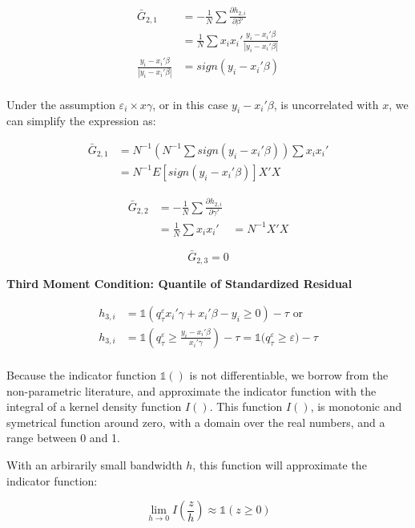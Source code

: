 \documentclass[
  authoryear,
  review,
  1p]{elsarticle}
\begin{document}
\[\begin{aligned}
\bar G_{2,1} &= -\frac{1}{N} \sum \frac{\partial h_{2,i}}{\partial \beta'} \\
             &=  \frac{1}{N} \sum x_i x_i' \frac{y_i-x_i'\beta}{|y_i-x_i'\beta|} \\
\frac{y_i-x_i'\beta}{|y_i-x_i'\beta|} &= sign(y_i-x_i'\beta) \\            
\end{aligned}
\]

Under the assumption \(\varepsilon_i \times x\gamma\), or in this case
\(y_i-x_i'\beta\), is uncorrelated with \(x\), we can simplify the
expression as:

\[\begin{aligned}
\bar G_{2,1} &= N^{-1} \left(N^{-1}\sum sign(y_i-x_i'\beta)\right) \sum x_i x_i' \\
&= N^{-1} E[sign(y_i-x_i'\beta)] X'X
\end{aligned}
\]

\[\begin{aligned}
\bar G_{2,2} &= -\frac{1}{N} \sum \frac{\partial h_{2,i}}{\partial \gamma'} \\
             &=  \frac{1}{N} \sum x_i x_i' 
             &= N^{-1} X'X
\end{aligned}
\]

\[\bar G_{2,3}=0\]

\textbf{Third Moment Condition: Quantile of Standardized Residual}

\[\begin{aligned}
h_{3,i} &= \mathbb{1}\left( q^\varepsilon_\tau x_i'\gamma +x_i'\beta - y_i \geq 0 \right) - \tau \text{ or}\\
h_{3,i} &= \mathbb{1}\left( q^\varepsilon_\tau  \geq \frac{y_i- x_i'\beta}{x_i'\gamma}  \right) - \tau = \mathbb{1}\big( q^\varepsilon_\tau  \geq \varepsilon  \big) - \tau \\
\end{aligned}
\]

Because the indicator function \(\mathbb{1}()\) is not differentiable,
we borrow from the non-parametric literature, and approximate the
indicator function with the integral of a kernel density function
\(I()\). This function \(I()\), is monotonic and symetrical function
around zero, with a domain over the real numbers, and a range between 0
and 1.

With an arbirarily small bandwidth \(h\), this function will approximate
the indicator function:

\[
\lim_{h\rightarrow 0} I\left(\frac{z}{h}\right) \approx \mathbb{1}(z\geq 0)
\]
\end{document}
